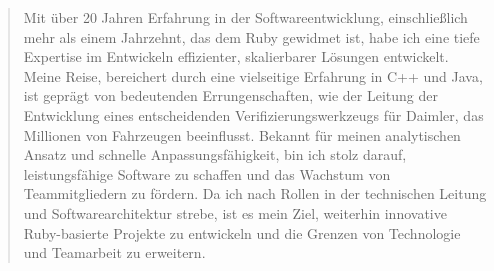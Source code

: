 \begin{quote}
Mit über 20 Jahren Erfahrung in der Softwareentwicklung, einschließlich mehr als einem Jahrzehnt, das dem Ruby gewidmet ist, habe ich eine tiefe Expertise im Entwickeln effizienter, skalierbarer Lösungen entwickelt. 
Meine Reise, bereichert durch eine vielseitige Erfahrung in C++ und Java, ist geprägt von bedeutenden Errungenschaften, wie der Leitung der Entwicklung eines entscheidenden Verifizierungswerkzeugs für Daimler, das Millionen von Fahrzeugen beeinflusst. 
Bekannt für meinen analytischen Ansatz und schnelle Anpassungsfähigkeit, bin ich stolz darauf, leistungsfähige Software zu schaffen und das Wachstum von Teammitgliedern zu fördern. 
Da ich nach Rollen in der technischen Leitung und Softwarearchitektur strebe, ist es mein Ziel, weiterhin innovative Ruby-basierte Projekte zu entwickeln und die Grenzen von Technologie und Teamarbeit zu erweitern.
\end{quote}
